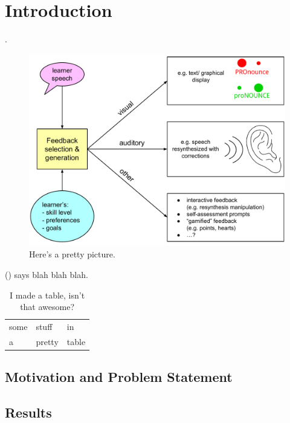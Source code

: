 %
\chapter{Introduction}
\label{chap:intro}


\blindtext \parencite{Duong2011}.

\begin{figure}
\caption{Here's a pretty picture.}
\includegraphics[width=.8\linewidth]{../img/feedback}
\end{figure}

\citeauthor{Sitaram2011} (\citeyear{Sitaram2011}) says blah blah blah.

\begin{table}
\caption{I made a table, isn't that awesome?}
\begin{tabular}{lll}
some & stuff & in \\
a & pretty & table \\
\end{tabular}
\end{table}


\section{Motivation and Problem Statement}
\label{sec:intro:motivation}

\Blindtext[3][1]

\section{Results}
\label{sec:intro:results}

